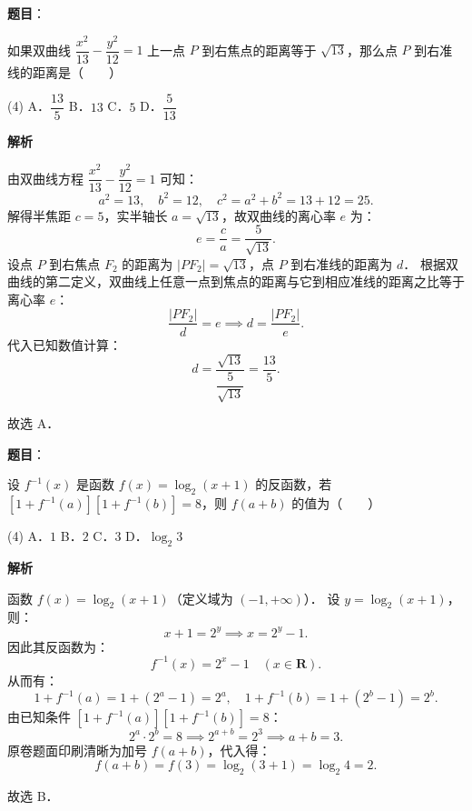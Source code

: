 \begin{answer}

\textbf{题目}：

如果双曲线 $\dfrac{x^2}{13} - \dfrac{y^2}{12} = 1$ 上一点 $P$ 到右焦点的距离等于 $\sqrt{13}$，那么点 $P$ 到右准线的距离是\mbox{（　　）}

\begin{gkopts}(4)
\task A．$\dfrac{13}{5}$
\task B．$13$
\task C．$5$
\task D．$\dfrac{5}{13}$
\end{gkopts}

\textbf{解析}

由双曲线方程 $\dfrac{x^2}{13} - \dfrac{y^2}{12} = 1$ 可知：
\nopagebreak[4]
\[
a^2 = 13, \quad b^2 = 12, \quad c^2 = a^2 + b^2 = 13 + 12 = 25.
\]
解得半焦距 $c = 5$，实半轴长 $a = \sqrt{13}$，故双曲线的离心率 $e$ 为：
\nopagebreak[4]
\[
e = \frac{c}{a} = \frac{5}{\sqrt{13}}.
\]
设点 $P$ 到右焦点 $F_2$ 的距离为 $|PF_2| = \sqrt{13}$，点 $P$ 到右准线的距离为 $d$．
根据双曲线的第二定义，双曲线上任意一点到焦点的距离与它到相应准线的距离之比等于离心率 $e$：
\nopagebreak[4]
\[
\frac{|PF_2|}{d} = e \implies d = \frac{|PF_2|}{e}.
\]
代入已知数值计算：
\nopagebreak[4]
\[
d = \frac{\sqrt{13}}{\dfrac{5}{\sqrt{13}}} = \frac{13}{5}.
\]

故选 A．


\end{answer}
\begin{answer}

\textbf{题目}：

设 $f^{-1}(x)$ 是函数 $f(x) = \log_2(x + 1)$ 的反函数，若 $[1 + f^{-1}(a)][1 + f^{-1}(b)] = 8$，则 $f(a + b)$ 的值为\mbox{（　　）}

\begin{gkopts}(4)
\task A．$1$
\task B．$2$
\task C．$3$
\task D．$\log_2 3$
\end{gkopts}

\textbf{解析}

函数 $f(x) = \log_2(x + 1)$（定义域为 $(-1, +\infty)$）．
设 $y = \log_2(x + 1)$，则：
\nopagebreak[4]
\[
x + 1 = 2^y \implies x = 2^y - 1.
\]
因此其反函数为：
\nopagebreak[4]
\[
f^{-1}(x) = 2^x - 1 \quad (x \in \mathbf{R}).
\]
从而有：
\nopagebreak[4]
\[
1 + f^{-1}(a) = 1 + (2^a - 1) = 2^a, \quad 1 + f^{-1}(b) = 1 + (2^b - 1) = 2^b.
\]
由已知条件 $[1 + f^{-1}(a)][1 + f^{-1}(b)] = 8$：
\nopagebreak[4]
\[
2^a \cdot 2^b = 8 \implies 2^{a+b} = 2^3 \implies a + b = 3.
\]
原卷题面印刷清晰为加号 $f(a + b)$，代入得：
\nopagebreak[4]
\[
f(a + b) = f(3) = \log_2(3 + 1) = \log_2 4 = 2.
\]

故选 B．


\end{answer}
